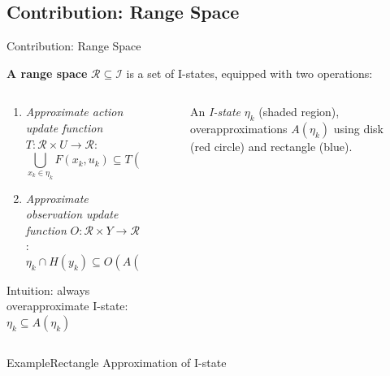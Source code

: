 \documentclass[10pt]{beamer}
\begin{document}
\subsection[Range Space]{Contribution: Range Space}
\begin{frame}{Contribution: Range Space}
  \begin{definition}{\textbf{A range space}}
    $\mathcal{R} \subseteq \mathcal{I}$ is a set of I-states, equipped with two
    operations:
  \end{definition}
  \begin{columns}
    \begin{column}{.5\textwidth}
      \begin{enumerate}
      \item \emph{Approximate action update function} $T: \mathcal{R} \times U \to
        \mathcal{R}$:
        $$\bigcup_{x_k \in \eta_k} F(x_k, u_k) \subseteq T(A(\eta_k), u_k)$$
      \item \emph{Approximate observation update function} $O: \mathcal{R} \times
        Y \to \mathcal{R}$:
        $$\eta_k \cap H(y_k) \subseteq O(A(\eta_k), u_k)$$
      \end{enumerate}
      \textcolor{scred}{Intuition: always overapproximate I-state:
        $\eta_k \subseteq A(\eta_k)$}
    \end{column}
    \begin{column}{.4\textwidth}
    \begin{figure}
    \caption{\scriptsize{An \emph{I-state} $\eta_k$ (shaded region),
        overapproximations $A(\eta_k)$ using disk (red circle) and rectangle
        (blue). }}
    \end{figure}
  \end{column}
\end{columns}
\end{frame}

\begin{frame}{Example}{Rectangle Approximation of I-state}
  \begin{center}
  \end{center}
\end{frame}
\end{document}
